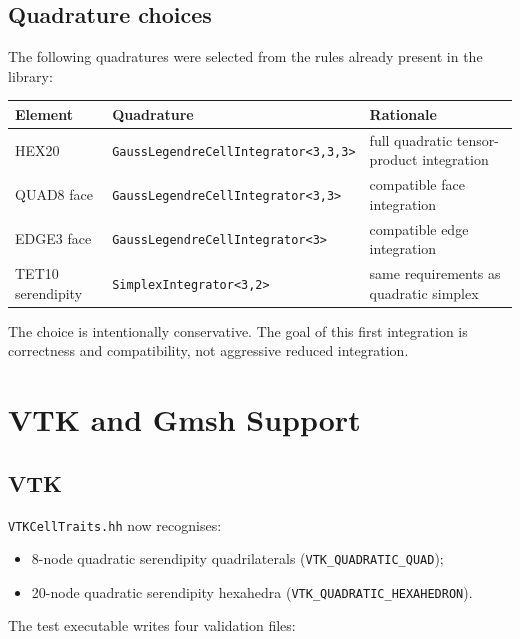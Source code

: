\subsection{Quadrature choices}

The following quadratures were selected from the rules already present in the
library:

\begin{center}
\begin{tabular}{lll}
  \toprule
  Element & Quadrature & Rationale \\
  \midrule
  HEX20 & \texttt{GaussLegendreCellIntegrator<3,3,3>} & full quadratic tensor-product integration \\
  QUAD8 face & \texttt{GaussLegendreCellIntegrator<3,3>} & compatible face integration \\
  EDGE3 face & \texttt{GaussLegendreCellIntegrator<3>} & compatible edge integration \\
  TET10 serendipity & \texttt{SimplexIntegrator<3,2>} & same requirements as quadratic simplex \\
  \bottomrule
\end{tabular}
\end{center}

The choice is intentionally conservative.  The goal of this first integration is
correctness and compatibility, not aggressive reduced integration.


\section{VTK and Gmsh Support}
\label{sec:serendipity_io}

\subsection{VTK}

\texttt{VTKCellTraits.hh} now recognises:

\begin{itemize}[nosep]
  \item 8-node quadratic serendipity quadrilaterals
        (\texttt{VTK\_QUADRATIC\_QUAD});
  \item 20-node quadratic serendipity hexahedra
        (\texttt{VTK\_QUADRATIC\_HEXAHEDRON}).
\end{itemize}

The test executable writes four validation files:

